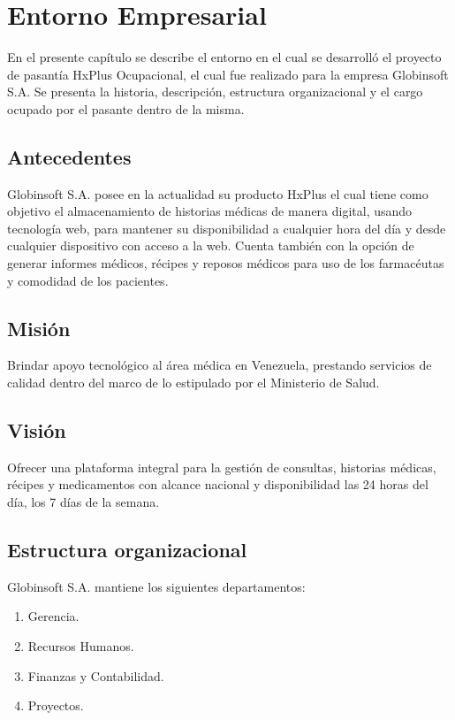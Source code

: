 \chapter{Entorno Empresarial}

En el presente capítulo se describe el entorno en el cual se desarrolló el proyecto de pasantía HxPlus Ocupacional, el cual fue realizado para la empresa Globinsoft S.A. Se presenta la historia, descripción, estructura organizacional y el cargo ocupado por el pasante dentro de la misma.

    \section{Antecedentes}
    Globinsoft S.A. posee en la actualidad su producto HxPlus el cual tiene como objetivo el almacenamiento de historias médicas de manera digital, usando tecnología web, para mantener su disponibilidad a cualquier hora del día y desde cualquier dispositivo con acceso a la web. Cuenta también con la opción de generar informes médicos, récipes y reposos médicos para uso de los farmacéutas y comodidad de los pacientes.
    
    
    \section{Misión}
    
    Brindar apoyo tecnológico al área médica en Venezuela, prestando servicios de calidad dentro del marco de lo estipulado por el Ministerio de Salud.
    
    \section{Visión}
    
    Ofrecer una plataforma integral para la gestión de consultas, historias médicas, récipes y medicamentos con alcance nacional y disponibilidad las 24 horas del día, los 7 días de la semana.
    
    \section{Estructura organizacional}
    
    Globinsoft S.A. mantiene los siguientes departamentos:
    
    \begin{enumerate}
        \item Gerencia.
        \item Recursos Humanos.
        \item Finanzas y Contabilidad.
        \item Proyectos.
    \end{enumerate}
    
